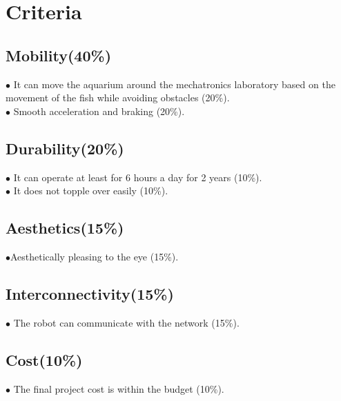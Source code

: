 \documentclass[12pt]{article}
\begin{document}
	\section{Criteria}
	\subsection{Mobility(40\%)}
	$\bullet$ It can move the aquarium around the mechatronics laboratory based on the movement of the fish while avoiding obstacles (20\%).\\
	$\bullet$ Smooth acceleration and braking (20\%).
	\subsection{Durability(20\%)}
	$\bullet$ It can operate at least for 6 hours a day for 2 years (10\%).\\
	$\bullet$ It does not topple over easily (10\%).
	\subsection{Aesthetics(15\%)}
	$\bullet$Aesthetically pleasing to the eye (15\%).
	\subsection{Interconnectivity(15\%)}
	$\bullet$ The robot can communicate with the network (15\%).
	\subsection{Cost(10\%)}
	$\bullet$ The final project cost is within the budget (10\%).
\end{document}
